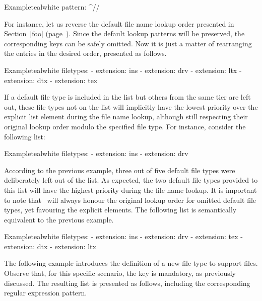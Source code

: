 \begin{description}
\begin{description}
\begin{itemize}[label={--}]
\begin{codebox}{Example}{teal}{\icnote}{white}
pattern: ^\s*//\s*
\end{codebox}
\end{itemize}
\end{description}

For instance, let us reverse the default file name lookup order presented in Section~\ref{foo} (page~\pageref{foo}). Since the default lookup patterns will be preserved, the corresponding  keys can be safely omitted. Now it is just a matter of rearranging the entries in the desired order, presented as follows.

\begin{codebox}{Example}{teal}{\icnote}{white}
filetypes:
- extension: ins
- extension: drv
- extension: ltx
- extension: dtx
- extension: tex
\end{codebox}

If a default file type is included in the  list but others from the same tier are left out, these file types not on the list will implicitly have the lowest priority over the explicit list element during the file name lookup, although still respecting their original lookup order modulo the specified file type. For instance, consider the following list:

\begin{codebox}{Example}{teal}{\icnote}{white}
filetypes:
- extension: ins
- extension: drv
\end{codebox}

According to the previous example, three out of five default file types were deliberately left out of the  list. As expected, the two default file types provided to this list will have the highest priority during the file name lookup. It is important to note that \arara\ will always honour the original lookup order for omitted default file types, yet favouring the explicit elements. The following list is semantically equivalent to the previous example.

\begin{codebox}{Example}{teal}{\icnote}{white}
filetypes:
- extension: ins
- extension: drv
- extension: tex
- extension: dtx
- extension: ltx
\end{codebox}

The following example introduces the definition of a new file type to support  files. Observe that, for this specific scenario, the  key is mandatory, as previously discussed. The resulting list is presented as follows, including the corresponding regular expression pattern.


\end{description}
